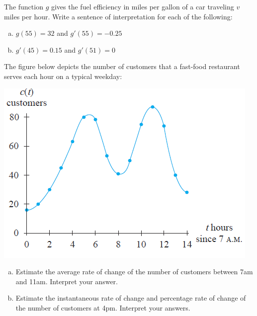 \documentclass[notes]{subfiles}
\begin{document}
		\begin{ex} The function $g$ gives the fuel efficiency in miles per gallon of a car traveling $v$ miles per hour.  Write a sentence of interpretation for each of the following:
			\begin{enumerate}[(a)]
				\item $g(55)=32$ and $g'(55)=-0.25$
				\item $g'(45) = 0.15$ and $g'(51) = 0$
			\end{enumerate}
		\end{ex}
			\newpage
			
		\begin{ex}
			The figure below depicts the number of customers that a fast-food restaurant serves each hour on a typical weekday:\\
			\begin{center}
				\includegraphics[scale = 1.5]{./img/sec23-1.png}
			\end{center}

			\begin{enumerate}[(a)]
				\item Estimate the average rate of change of the number of customers between 7am and 11am.  Interpret your answer.
					
				\item Estimate the instantaneous rate of change and percentage rate of change of the number of customers at 4pm.  Interpret your answers.
			\end{enumerate}			
		\end{ex}
	\clearpage
\end{document}
